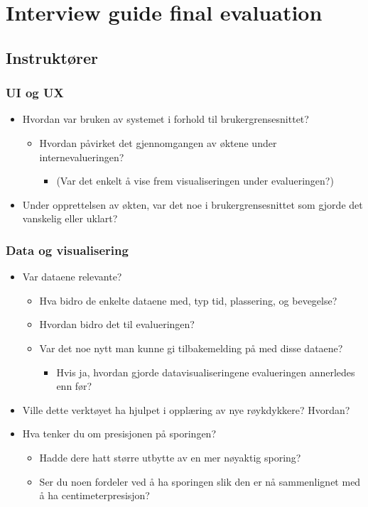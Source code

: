 \documentclass[../Main/thesis.tex]{subfiles}
\begin{document}
\chapter{Interview guide final evaluation}
\label{app:interview-guide-final}
\section*{Instruktører}
\subsection*{UI og UX}
\begin{itemize}
	\item Hvordan var bruken av systemet i forhold til brukergrensesnittet?
\begin{itemize}
	\item Hvordan påvirket det gjennomgangen av øktene under internevalueringen?
	\begin{itemize}
		\item (Var det enkelt å vise frem visualiseringen under evalueringen?)
\end{itemize}
\end{itemize}
\item Under opprettelsen av økten, var det noe i brukergrensesnittet som gjorde det vanskelig eller uklart?
\end{itemize}
\subsection*{Data og visualisering}
\begin{itemize}
	\item Var dataene relevante?
\begin{itemize}
	\item Hva bidro de enkelte dataene med, typ tid, plassering, og bevegelse?
	\item Hvordan bidro det til evalueringen?
	\item Var det noe nytt man kunne gi tilbakemelding på med disse dataene?
	\begin{itemize}
		\item Hvis ja, hvordan gjorde datavisualiseringene evalueringen annerledes enn før?
\end{itemize}
\end{itemize}
\item Ville dette verktøyet ha hjulpet i opplæring av nye røykdykkere? Hvordan?
\item Hva tenker du om presisjonen på sporingen?
\begin{itemize}
	\item Hadde dere hatt større utbytte av en mer nøyaktig sporing?
	\item Ser du noen fordeler ved å ha sporingen slik den er nå sammenlignet med å ha centimeterpresisjon?
	\end{itemize}
	\end{itemize}
\end{document}
